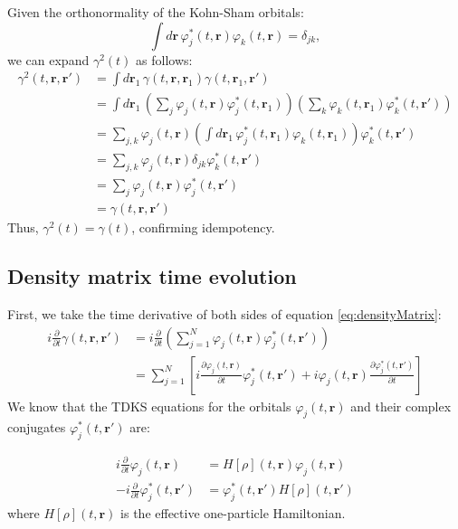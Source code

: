 \documentclass[12pt]{article}
\begin{document}
Given the orthonormality of the Kohn-Sham orbitals:
\[
\int d\mathbf{r}\, \varphi_{j}^{*}(t, \mathbf{r}) \varphi_{k}(t, \mathbf{r}) = \delta_{jk},
\]
we can expand $\gamma^2(t)$ as follows:
\begin{align*}
\gamma^{2}(t, \mathbf{r}, \mathbf{r}') &= \int d\mathbf{r}_1\, \gamma(t, \mathbf{r}, \mathbf{r}_1) \gamma(t, \mathbf{r}_1, \mathbf{r}') \\
&= \int d\mathbf{r}_1\, \left( \sum_{j} \varphi_{j}(t, \mathbf{r}) \varphi_{j}^{*}(t, \mathbf{r}_1) \right) \left( \sum_{k} \varphi_{k}(t, \mathbf{r}_1) \varphi_{k}^{*}(t, \mathbf{r}') \right) \\
&= \sum_{j,k} \varphi_{j}(t, \mathbf{r}) \left( \int d\mathbf{r}_1\, \varphi_{j}^{*}(t, \mathbf{r}_1) \varphi_{k}(t, \mathbf{r}_1) \right) \varphi_{k}^{*}(t, \mathbf{r}') \\
&= \sum_{j,k} \varphi_{j}(t, \mathbf{r}) \delta_{jk} \varphi_{k}^{*}(t, \mathbf{r}') \\
&= \sum_{j} \varphi_{j}(t, \mathbf{r}) \varphi_{j}^{*}(t, \mathbf{r}') \\
&= \gamma(t, \mathbf{r}, \mathbf{r}')
\end{align*}
Thus, $\gamma^{2}(t) = \gamma(t)$, confirming idempotency.
\subsection{Density matrix time evolution}
\label{sec:densityMatrixTD}
First, we take the time derivative of both sides of equation \ref{eq:densityMatrix}:
\begin{align}
i \frac{\partial}{\partial t} \gamma(t, \mathbf{r}, \mathbf{r}') &= i \frac{\partial}{\partial t} \left( \sum_{j=1}^{N} \varphi_{j}(t, \mathbf{r}) \varphi_{j}^{*}(t, \mathbf{r}') \right) \\
&= \sum_{j=1}^{N} \left[ i \frac{\partial \varphi_{j}(t, \mathbf{r})}{\partial t} \varphi_{j}^{*}(t, \mathbf{r}') + i \varphi_{j}(t, \mathbf{r}) \frac{\partial \varphi_{j}^{*}(t, \mathbf{r}')}{\partial t} \right]
\end{align}
We know that the TDKS equations for the orbitals \( \varphi_{j}(t, \mathbf{r}) \) and their complex conjugates \( \varphi_{j}^{*}(t, \mathbf{r}') \) are:

\begin{align}
i \frac{\partial}{\partial t} \varphi_{j}(t, \mathbf{r}) &= H[\rho](t, \mathbf{r}) \varphi_{j}(t, \mathbf{r}) \\
-i \frac{\partial}{\partial t} \varphi_{j}^{*}(t, \mathbf{r}') &= \varphi_{j}^{*}(t, \mathbf{r}') H[\rho](t, \mathbf{r}') 
\end{align}
where \( H[\rho](t, \mathbf{r}) \) is the effective one-particle Hamiltonian.
\end{document}
